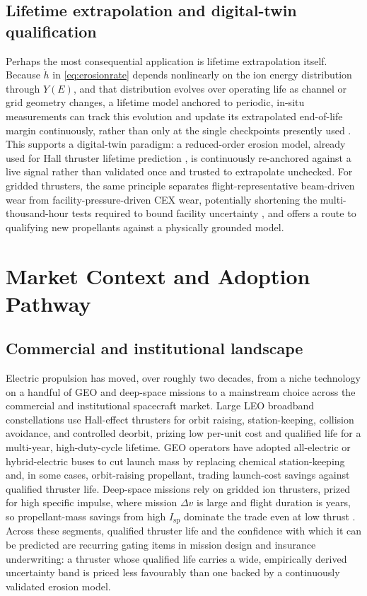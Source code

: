 \subsection{Lifetime extrapolation and digital-twin qualification}

Perhaps the most consequential application is lifetime extrapolation itself. Because $\dot h$ in \cref{eq:erosionrate} depends nonlinearly on the ion energy distribution through $Y(E)$, and that distribution evolves over operating life as channel or grid geometry changes, a lifetime model anchored to periodic, in-situ measurements can track this evolution and update its extrapolated end-of-life margin continuously, rather than only at the single checkpoints presently used \cite{ref0440}. This supports a digital-twin paradigm: a reduced-order erosion model, already used for Hall thruster lifetime prediction \cite{ref0433}, is continuously re-anchored against a live signal rather than validated once and trusted to extrapolate unchecked. For gridded thrusters, the same principle separates flight-representative beam-driven wear from facility-pressure-driven CEX wear, potentially shortening the multi-thousand-hour tests required to bound facility uncertainty \cite{ref0461,ref0481}, and offers a route to qualifying new propellants against a physically grounded model.

\section{Market Context and Adoption Pathway}
\label{sec:ep-market}

\subsection{Commercial and institutional landscape}

Electric propulsion has moved, over roughly two decades, from a niche technology on a handful of GEO and deep-space missions to a mainstream choice across the commercial and institutional spacecraft market. Large LEO broadband constellations use Hall-effect thrusters for orbit raising, station-keeping, collision avoidance, and controlled deorbit, prizing low per-unit cost and qualified life for a multi-year, high-duty-cycle lifetime. GEO operators have adopted all-electric or hybrid-electric buses to cut launch mass by replacing chemical station-keeping and, in some cases, orbit-raising propellant, trading launch-cost savings against qualified thruster life. Deep-space missions rely on gridded ion thrusters, prized for high specific impulse, where mission $\Delta v$ is large and flight duration is years, so propellant-mass savings from high $I_{\mathrm{sp}}$ dominate the trade even at low thrust \cite{ref0115}. Across these segments, qualified thruster life and the confidence with which it can be predicted are recurring gating items in mission design and insurance underwriting: a thruster whose qualified life carries a wide, empirically derived uncertainty band is priced less favourably than one backed by a continuously validated erosion model.


